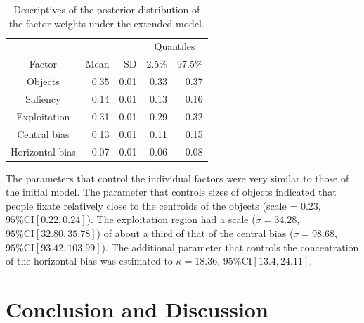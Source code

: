 \documentclass{article}
\begin{document}
\begin{table}
    \centering
\begin{tabular}{c r r r r}
\toprule
\multicolumn{3}{c}{} & \multicolumn{2}{c}{Quantiles} \\
\cmidrule{4-5}
Factor & Mean & SD & 2.5\% & 97.5\%\\
\hline
Objects & 0.35 & 0.01 & 0.33 & 0.37\\
Saliency & 0.14 & 0.01 & 0.13 & 0.16\\
Exploitation &0.31 & 0.01 & 0.29 & 0.32\\
Central bias &0.13 & 0.01 & 0.11 & 0.15\\
Horizontal bias & 0.07 & 0.01 & 0.06 & 0.08\\
\bottomrule
\end{tabular}
    \caption{Descriptives of the posterior distribution of the factor weights under the extended model.}
    \label{tab:weights_model_horizontal}
\end{table}

The parameters that control the individual factors were very similar to those of the initial model. The parameter that controls sizes of objects indicated that people fixate relatively close to the centroids of the objects (scale = $0.23$, $95\%\text{CI}[0.22, 0.24]$). The exploitation region had a scale ($\sigma = 34.28$, $95\%\text{CI}[32.80, 35.78]$) of about a third of that of the central bias ($\sigma=98.68$, $95\%\text{CI}[93.42, 103.99]$). The additional parameter that controls the concentration of the horizontal bias was estimated to $\kappa = 18.36$, $95\%\text{CI}[13.4,24.11]$.


\section{Conclusion and Discussion}
\end{document}
